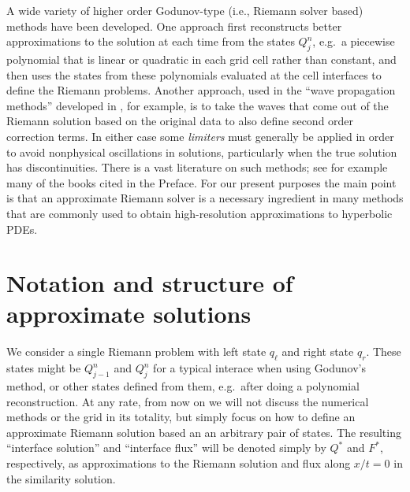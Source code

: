 \documentclass{SIAMbook2016}
\begin{document}
A wide variety of higher order Godunov-type (i.e., Riemann solver based)
methods have been developed. One approach first reconstructs better
approximations to the solution at each time from the states \(Q_j^n\),
e.g.~a piecewise polynomial that is linear or quadratic in each grid
cell rather than constant, and then uses the states from these
polynomials evaluated at the cell interfaces to define the Riemann
problems. Another approach, used in the ``wave propagation methods''
developed in \cite{fvmhp}, for example, is to take the waves that come
out of the Riemann solution based on the original data to also define
second order correction terms. In either case some \emph{limiters} must
generally be applied in order to avoid nonphysical oscillations in
solutions, particularly when the true solution has discontinuities.
There is a vast literature on such methods; see for example many of the
books cited in the Preface. For our present
purposes the main point is that an approximate Riemann solver is a
necessary ingredient in many methods that are commonly used to obtain
high-resolution approximations to hyperbolic PDEs.

\hypertarget{notation-and-structure-of-approximate-solutions}{%
\section{Notation and structure of approximate
solutions}\label{notation-and-structure-of-approximate-solutions}}

We consider a single Riemann problem with left state \(q_\ell\) and
right state \(q_r\). These states might be \(Q_{j-1}^n\) and \(Q_j^n\)
for a typical interace when using Godunov's method, or other states
defined from them, e.g.~after doing a polynomial reconstruction. At any
rate, from now on we will not discuss the numerical methods or the grid
in its totality, but simply focus on how to define an approximate
Riemann solution based an an arbitrary pair of states. The resulting
``interface solution'' and ``interface flux'' will be denoted simply by
\(Q^*\) and \(F^*\), respectively, as approximations to the Riemann
solution and flux along \(x/t =0\) in the similarity solution.
\end{document}

